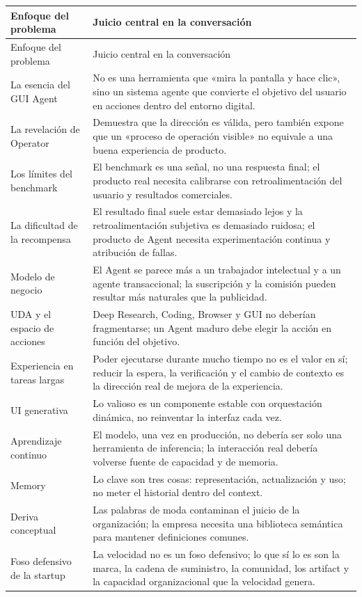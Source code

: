 \begin{longtable}{>{\raggedright\arraybackslash}p{} >{\raggedright\arraybackslash}p{}}
\toprule
Enfoque del problema & Juicio central en la conversación \\
\midrule
\endfirsthead
\toprule
Enfoque del problema & Juicio central en la conversación \\
\midrule
\endhead
La esencia del GUI Agent & No es una herramienta que «mira la pantalla y hace clic», sino un sistema agente que convierte el objetivo del usuario en acciones dentro del entorno digital. \\
La revelación de Operator & Demuestra que la dirección es válida, pero también expone que un «proceso de operación visible» no equivale a una buena experiencia de producto. \\
Los límites del benchmark & El benchmark es una señal, no una respuesta final; el producto real necesita calibrarse con retroalimentación del usuario y resultados comerciales. \\
La dificultad de la recompensa & El resultado final suele estar demasiado lejos y la retroalimentación subjetiva es demasiado ruidosa; el producto de Agent necesita experimentación continua y atribución de fallas. \\
Modelo de negocio & El Agent se parece más a un trabajador intelectual y a un agente transaccional; la suscripción y la comisión pueden resultar más naturales que la publicidad. \\
UDA y el espacio de acciones & Deep Research, Coding, Browser y GUI no deberían fragmentarse; un Agent maduro debe elegir la acción en función del objetivo. \\
Experiencia en tareas largas & Poder ejecutarse durante mucho tiempo no es el valor en sí; reducir la espera, la verificación y el cambio de contexto es la dirección real de mejora de la experiencia. \\
UI generativa & Lo valioso es un componente estable con orquestación dinámica, no reinventar la interfaz cada vez. \\
Aprendizaje continuo & El modelo, una vez en producción, no debería ser solo una herramienta de inferencia; la interacción real debería volverse fuente de capacidad y de memoria. \\
Memory & Lo clave son tres cosas: representación, actualización y uso; no meter el historial dentro del context. \\
Deriva conceptual & Las palabras de moda contaminan el juicio de la organización; la empresa necesita una biblioteca semántica para mantener definiciones comunes. \\
Foso defensivo de la startup & La velocidad no es un foso defensivo; lo que sí lo es son la marca, la cadena de suministro, la comunidad, los artifact y la capacidad organizacional que la velocidad genera. \\
\bottomrule
\end{longtable}

